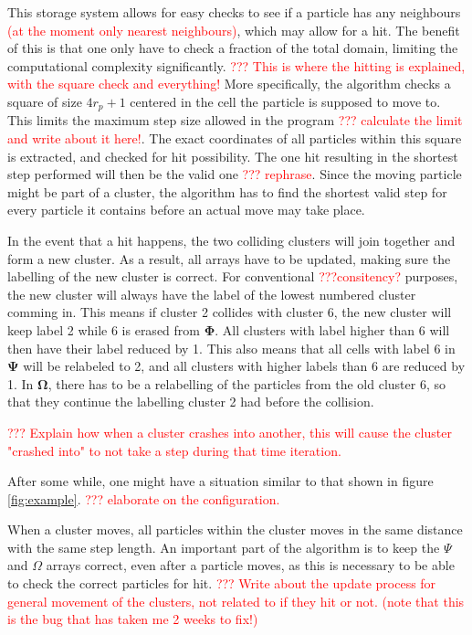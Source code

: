 This storage system allows for easy checks to see if a particle has any neighbours \textcolor{red}{(at the moment only nearest neighbours)}, which may allow for a hit. The benefit of this is that one only have to check a fraction of the total domain, limiting the computational complexity significantly. \textcolor{red}{??? This is where the hitting is explained, with the square check and everything!} More specifically, the algorithm checks a square of size $4r_p +1$ centered in the cell the particle is supposed to move to. This limits the maximum step size allowed in the program \textcolor{red}{??? calculate the limit and write about it here!}. The exact coordinates of all particles within this square is extracted, and checked for hit possibility. The one hit resulting in the shortest step performed will then be the valid one \textcolor{red}{??? rephrase}. Since the moving particle might be part of a cluster, the algorithm has to find the shortest valid step for every particle it contains before an actual move may take place.

In the event that a hit happens, the two colliding clusters will join together and form a new cluster. As a result, all arrays have to be updated, making sure the labelling of the new cluster is correct. For conventional \textcolor{red}{???consitency?} purposes, the new cluster will always have the label of the lowest numbered cluster comming in. This means if cluster 2 collides with cluster 6, the new cluster will keep label 2 while 6 is erased from $\mathbf{\Phi}$. All clusters with label higher than 6 will then have their label reduced by 1. This also means that all cells with label 6 in $\mathbf{\Psi}$ will be relabeled to 2, and all clusters with higher labels than 6 are reduced by 1. In $\mathbf{\Omega}$, there has to be a relabelling of the particles from the old cluster 6, so that they continue the labelling cluster 2 had before the collision. 

\textcolor{red}{??? Explain how when a cluster crashes into another, this will cause the cluster "crashed into" to not take a step during that time iteration. }

 After some while, one might have a situation similar to that shown in figure \ref{fig:example}. \textcolor{red}{??? elaborate on the configuration.}

When a cluster moves, all particles within the cluster moves in the same distance with the same step length. An important part of the algorithm is to keep the $\Psi$ and $\Omega$ arrays correct, even after a particle moves, as this is necessary to be able to check the correct particles for hit. \textcolor{red}{??? Write about the update process for general movement of the clusters, not related to if they hit or not. (note that this is the bug that has taken me 2 weeks to fix!)}

